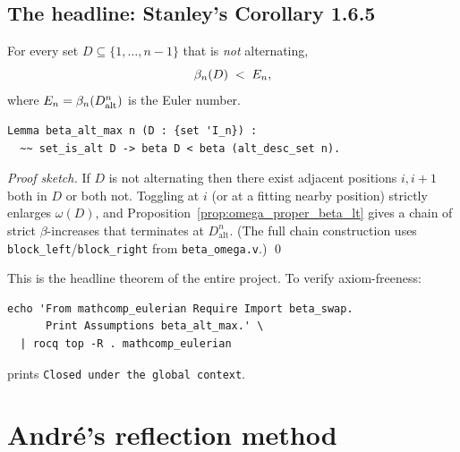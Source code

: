 \section{The headline: Stanley's Corollary 1.6.5}

\begin{corollary}
  \label{cor:beta_alt_max}
  For every set $D \subseteq \{1, \dots, n-1\}$ that is \emph{not}
  alternating,
  \[
    \beta_{n}(D) \;<\; E_n,
  \]
  where $E_n = \beta_{n}(D_{\mathrm{alt}}^n)$ is the Euler number.
\end{corollary}

\begin{lstlisting}[language=Rocq]
Lemma beta_alt_max n (D : {set 'I_n}) :
  ~~ set_is_alt D -> beta D < beta (alt_desc_set n).
\end{lstlisting}


\noindent
\emph{Proof sketch.} If $D$ is not alternating then there exist
adjacent positions $i, i+1$ both in $D$ or both not. Toggling at
$i$ (or at a fitting nearby position) strictly enlarges
$\omega(D)$, and Proposition~\ref{prop:omega_proper_beta_lt}
gives a chain of strict $\beta$-increases that terminates at
$D_{\mathrm{alt}}^n$. (The full chain construction uses
\texttt{block\_left}/\texttt{block\_right} from
\texttt{beta\_omega.v}.) \qed

\noindent This is the headline theorem of the entire project. To
verify axiom-freeness:

\begin{verbatim}
echo 'From mathcomp_eulerian Require Import beta_swap.
      Print Assumptions beta_alt_max.' \
  | rocq top -R . mathcomp_eulerian
\end{verbatim}

\noindent prints \texttt{Closed under the global context}.

\clearpage

\chapter{Andr\'e's reflection method}
\label{ch:reflection}

